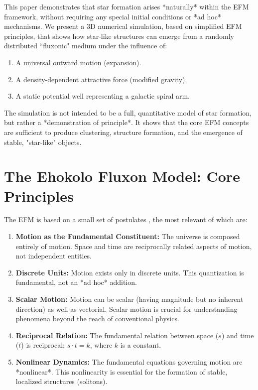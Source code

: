 \documentclass[11pt]{article}
\begin{document}
This paper demonstrates that star formation arises *naturally* within the EFM framework, without requiring any special initial conditions or *ad hoc* mechanisms. We present a 3D numerical simulation, based on simplified EFM principles, that shows how star-like structures can emerge from a randomly distributed ``fluxonic" medium under the influence of:

\begin{enumerate}
    \item A universal outward motion (expansion).
    \item A density-dependent attractive force (modified gravity).
    \item A static potential well representing a galactic spiral arm.
\end{enumerate}

The simulation is not intended to be a full, quantitative model of star formation, but rather a *demonstration of principle*. It shows that the core EFM concepts are sufficient to produce clustering, structure formation, and the emergence of stable, "star-like" objects.

\section{The Ehokolo Fluxon Model: Core Principles}

The EFM is based on a small set of postulates \citep{emvula2025compendium}, the most relevant of which are:

\begin{enumerate}
    \item \textbf{Motion as the Fundamental Constituent:} The universe is composed entirely of motion. Space and time are reciprocally related aspects of motion, not independent entities.
    \item \textbf{Discrete Units:} Motion exists only in discrete units. This quantization is fundamental, not an *ad hoc* addition.
    \item \textbf{Scalar Motion:} Motion can be scalar (having magnitude but no inherent direction) as well as vectorial. Scalar motion is crucial for understanding phenomena beyond the reach of conventional physics.
\item \textbf{Reciprocal Relation: }The fundamental relation between space ($s$) and time ($t$) is reciprocal: $s \cdot t = k$, where $k$ is a constant.
    \item \textbf{Nonlinear Dynamics:} The fundamental equations governing motion are *nonlinear*. This nonlinearity is essential for the formation of stable, localized structures (solitons).
\end{enumerate}
\end{document}
